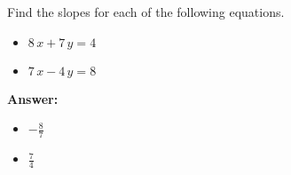  Find the slopes for each of the following equations. \begin{itemize}\item \( 8 \, x + 7 \, y = 4 \)\item \( 7 \, x - 4 \, y = 8 \)\end{itemize}

        \textbf{Answer:} \begin{itemize}\item \( -\frac{8}{7} \)\item \( \frac{7}{4} \)\end{itemize}
